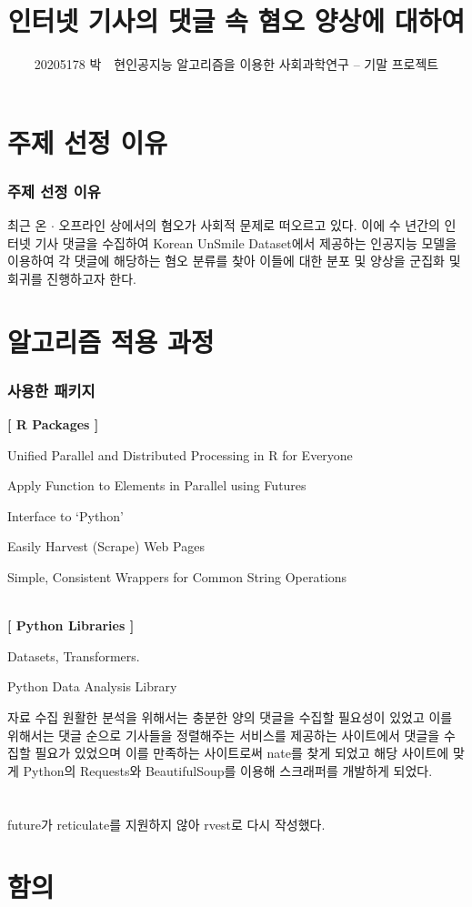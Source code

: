 \documentclass[mathserif, aspectratio=169]{beamer}
\title{인터넷 기사의 댓글 속 혐오 양상에 대하여}
\author{20205178 박~~현\hfill 인공지능 알고리즘을 이용한 사회과학연구 -- 기말 프로젝트}
\institute{}
\date{}
\begin{document}
\frame{\titlepage}

\section{주제 선정 이유}
\begin{frame}
    \frametitle{주제 선정 이유}
    \justifying
    최근 온 $\cdot$ 오프라인 상에서의 혐오가 사회적 문제로 떠오르고 있다.
    이에 수 년간의 인터넷 기사 댓글을 수집하여 Korean UnSmile Dataset에서 제공하는 인공지능 모델을
    이용하여 각 댓글에 해당하는 혐오 분류를 찾아 이들에 대한 분포 및 양상을 군집화 및 회귀를 진행하고자 한다.
\end{frame}
\section{알고리즘 적용 과정}
\begin{frame}
    \frametitle{사용한 패키지}
    \textbf{[ R Packages ]}
    \begin{description}[labelwidth=3cm]
        \item [future:] Unified Parallel and Distributed Processing in R for Everyone
        \item [future.apply:] Apply Function to Elements in Parallel using Futures
        \item [reticulate:]  Interface to `Python'
        \item [rvest:] Easily Harvest (Scrape) Web Pages
        \item [stringr:] Simple, Consistent Wrappers for Common String Operations
    \end{description}
    ~\\
    \textbf{[ Python Libraries ]}
    \begin{description}[labelwidth=3cm]
        \item [Hugging Face:] Datasets, Transformers.
        \item [Pandas:] Python Data Analysis Library
    \end{description}
\end{frame}
\begin{frame}{자료 수집}
    \justifying
    원활한 분석을 위해서는 충분한 양의 댓글을 수집할 필요성이 있었고
    이를 위해서는 댓글 순으로 기사들을 정렬해주는 서비스를 제공하는 
    사이트에서 댓글을 수집할 필요가 있었으며 이를 만족하는 사이트로써
    nate를 찾게 되었고 해당 사이트에 맞게 Python의 Requests와 BeautifulSoup를 이용해
    스크래퍼를 개발하게 되었다.\\~\\~\\
    \hfill{} future가 reticulate를 지원하지 않아 rvest로 다시 작성했다.
\end{frame}
\section{함의}
\end{document}
